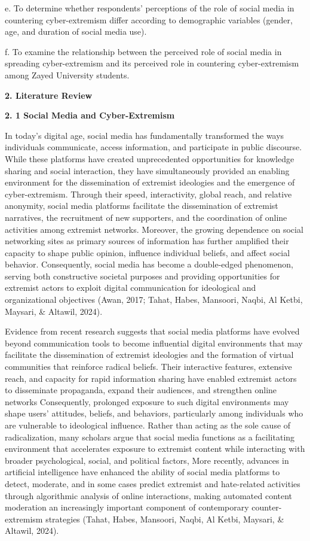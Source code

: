 \documentclass[11pt,a4paper]{article}
\begin{document}
	e. To determine whether respondents' perceptions of the role of social media in countering cyber-extremism differ according to demographic variables (gender, age, and duration of social media use).
	
	f. To examine the relationship between the perceived role of social media in spreading cyber-extremism and its perceived role in countering cyber-extremism among Zayed University students.
	
	\textbf{2. Literature Review}
	
	\textbf{2. 1 Social Media and Cyber-Extremism}
	
	In today's digital age, social media has fundamentally transformed the ways individuals communicate, access information, and participate in public discourse. While these platforms have created unprecedented opportunities for knowledge sharing and social interaction, they have simultaneously provided an enabling environment for the dissemination of extremist ideologies and the emergence of cyber-extremism. Through their speed, interactivity, global reach, and relative anonymity, social media platforms facilitate the dissemination of extremist narratives, the recruitment of new supporters, and the coordination of online activities among extremist networks. Moreover, the growing dependence on social networking sites as primary sources of information has further amplified their capacity to shape public opinion, influence individual beliefs, and affect social behavior. Consequently, social media has become a double-edged phenomenon, serving both constructive societal purposes and providing opportunities for extremist actors to exploit digital communication for ideological and organizational objectives (Awan, 2017; Tahat, Habes, Mansoori, Naqbi, Al Ketbi, Maysari, \& Altawil, 2024).
	
	Evidence from recent research suggests that social media platforms have evolved beyond communication tools to become influential digital environments that may facilitate the dissemination of extremist ideologies and the formation of virtual communities that reinforce radical beliefs. Their interactive features, extensive reach, and capacity for rapid information sharing have enabled extremist actors to disseminate propaganda, expand their audiences, and strengthen online networks Consequently, prolonged exposure to such digital environments may shape users' attitudes, beliefs, and behaviors, particularly among individuals who are vulnerable to ideological influence. Rather than acting as the sole cause of radicalization, many scholars argue that social media functions as a facilitating environment that accelerates exposure to extremist content while interacting with broader psychological, social, and political factors, More recently, advances in artificial intelligence have enhanced the ability of social media platforms to detect, moderate, and in some cases predict extremist and hate-related activities through algorithmic analysis of online interactions, making automated content moderation an increasingly important component of contemporary counter-extremism strategies (Tahat, Habes, Mansoori, Naqbi, Al Ketbi, Maysari, \& Altawil, 2024).
	
\end{document}
